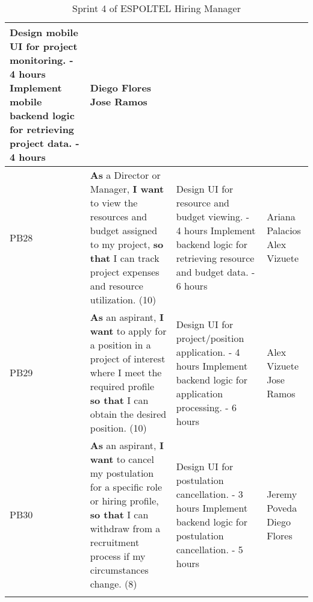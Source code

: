 \documentclass{scrreprt}
\begin{document}
\begin{longtable}{|p{1.5cm}|p{5.5cm}|p{4.5cm}|p{3cm}|}
	Design mobile UI for project monitoring. - 4 hours \newline
	Implement mobile backend logic for retrieving project data. - 4 hours &
	Diego Flores \newline
	Jose Ramos \\ \hline
	
	PB28 & \textbf{As} a Director or Manager, \textbf{I want} to view the resources and budget assigned to my project, \textbf{so that} I can track project expenses and resource utilization. (10) &
	
	Design UI for resource and budget viewing. - 4 hours \newline
	Implement backend logic for retrieving resource and budget data. - 6 hours &
	Ariana Palacios \newline
	Alex Vizuete \\ \hline
	
	PB29 & \textbf{As} an aspirant, \textbf{I want} to apply for a position in a project of interest where I meet the required profile \textbf{so that} I can obtain the desired position. (10) &
	
	Design UI for project/position application. - 4 hours \newline
	Implement backend logic for application processing. - 6 hours &
	Alex Vizuete \newline
	Jose Ramos \\ \hline
	
	PB30 & \textbf{As} an aspirant, \textbf{I want} to cancel my postulation for a specific role or hiring profile, \textbf{so that} I can withdraw from a recruitment process if my circumstances change. (8) &
	
	Design UI for postulation cancellation. - 3 hours \newline
	Implement backend logic for postulation cancellation. - 5 hours &
	Jeremy Poveda \newline
	Diego Flores \\ \hline
	
	\caption{Sprint 4 of ESPOLTEL Hiring Manager}
\end{longtable}
\end{document}
